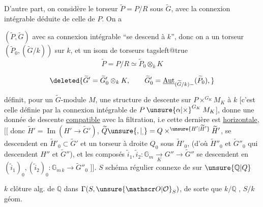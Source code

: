 D'autre part, on considère le torseur $\widetilde P=P/R$ sous $\widetilde G$, avec la connexion intégrable déduite de celle de $P$. On a

  $(\widetilde P,\widetilde G)$ avec sa connexion intégrable ``se descend à $k$'', donc on a un torseur $(\widetilde P_0,(\widetilde G/k))$ sur $k$, et un isom de torseurs
\begingroup
\csname tagsleft@true\endcsname
\[
\widetilde P=P/R\simeq\widetilde P_0\otimes_k K \tag*{(*)}
\]
\endgroup

\[
\deleted{\widetilde G'=\widetilde G'_0\otimes_k K,\qquad
\widetilde G'_0=\underline{\operatorname{Aut}}_{(\widetilde G/k)-}(\widetilde P_0),}
\]

  définit, pour un $\widetilde G$-module $M$, une structure de descente sur $P\mathbin{\times}^{G_K}M_K$ à $k$\unsure{,|;} [c'est celle définie par la connexion intégrable de $P\mathbin{\unsure{\alpha|\times}}^{G_K}M_K$], donne une donnée de descente \uline{compatible} avec la filtration, i.e cette dernière est \uline{horizontale}, $\bigl[\!\bigl[$ donc  $\widetilde H'=\operatorname{Im}(H'\longrightarrow\widetilde G')$, $\widetilde Q\unsure{,|_{,}}=Q\mathbin{\times}^{\unsure{H'|\widetilde H'}}\widetilde H'$, se descendent  en $\widetilde H'_0\subset\widetilde G'$ et un torseur à droite $Q_0$ sous $\widetilde H'_0$,  (d'où $\widetilde H''_0$ et $\widetilde G''_0$ qui descendent $H''$ et $\widetilde G''$), et  les composés $\tilde i_1,\tilde i_2:\mathbb G_m\underset K{\longrightarrow}G''\longrightarrow\widetilde G''$ se descendent en $(\tilde i_1)_0,(\tilde i_2)_0:\mathbb G_{m\,k}\longrightarrow\widetilde G''_0$ $\bigr]\!\bigr]$.
$S$ schéma régulier connexe de  sur $\unsure{\mathbb Q|Q}$

$k$ clôture alg. de $\mathbb Q$ dans $\Gamma(S,\unsure{\mathscr O|\mathcal O}_S)$, de sorte que $k/\mathbb Q$ , $S/k$ géom. 

